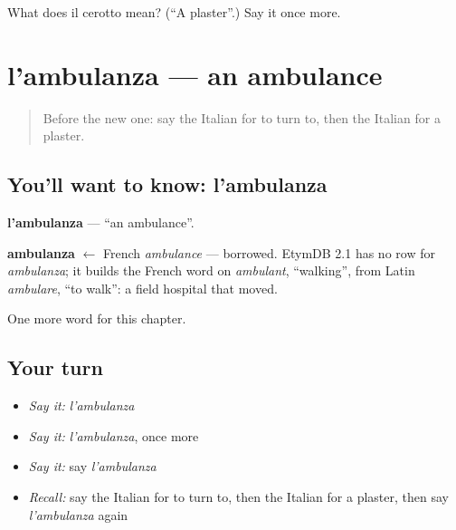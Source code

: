 \begin{tcolorbox}[breakable,colback=teal!4,colframe=teal!35!black,title={Before you move on}]
What does il cerotto mean? (\textquotedblleft{}A plaster\textquotedblright{}.) Say it once more.
\end{tcolorbox}
\section[l'ambulanza]{l'ambulanza — an ambulance}

\label{lesson:IT-C243-ambulanza}



\begin{quote}
Before the new one: say the Italian for to turn to, then the Italian for a plaster.
\end{quote}

\subsection*{You'll want to know: l'ambulanza}
\textbf{l'ambulanza} — \textquotedblleft{}an ambulance\textquotedblright{}.

\begin{cousinweb}
\textbf{ambulanza} $\leftarrow$ French \emph{ambulance} — borrowed. EtymDB 2.1 has no row for \emph{ambulanza}; it builds the French word on \emph{ambulant}, \textquotedblleft{}walking\textquotedblright{}, from Latin \emph{ambulare}, \textquotedblleft{}to walk\textquotedblright{}: a field hospital that moved.
\end{cousinweb}

\begin{grammarlens}[title={What you've built}]
One more word for this chapter.
\end{grammarlens}

\subsection*{Your turn}
\begin{itemize}
\raggedright
  \item \emph{Say it:} \emph{l'ambulanza}
  \item \emph{Say it:} \emph{l'ambulanza}, once more
  \item \emph{Say it:} say \emph{l'ambulanza}
  \item \emph{Recall:} say the Italian for to turn to, then the Italian for a plaster, then say \emph{l'ambulanza} again
\end{itemize}

